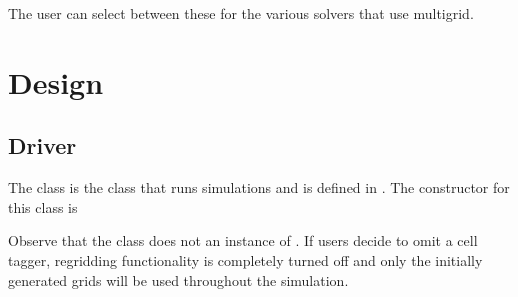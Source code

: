 \documentclass[letterpaper,10pt,english]{sphinxmanual}
\begin{document}
The user can select between these for the various solvers that use multigrid.


\chapter{Design}
\label{\detokenize{index:design}}

\section{Driver}
\label{\detokenize{Source/Driver:driver}}\label{\detokenize{Source/Driver:chap-driver}}\label{\detokenize{Source/Driver::doc}}
The  class is the class that runs  simulations and is defined in .
The constructor for this class is

\begin{sphinxVerbatim}[commandchars=\\\{\},formatcom=\scriptsize]
  
                   
                       
                      
                    
\end{sphinxVerbatim}

Observe that the  class does not  an instance of {\hyperref[\detokenize{Source/CellTagger:chap-celltagger}]{}}.
If users decide to omit a cell tagger, regridding functionality is completely turned off and only the initially generated grids will be used throughout the simulation.
\end{document}

